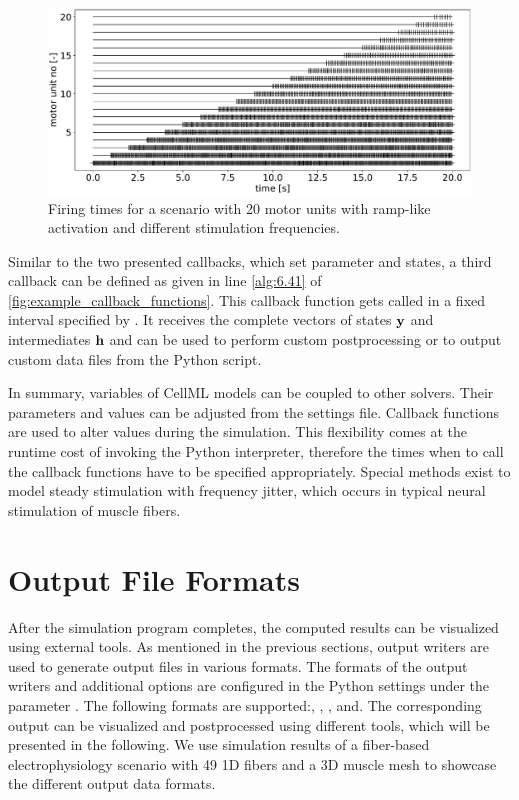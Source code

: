 \begin{figure}%
  \centering%
  \includegraphics[width=\textwidth]{images/implementation/firing_times_ramp1.pdf}%
  \caption{Firing times for a scenario with 20 motor units with ramp-like activation and different stimulation frequencies.}%
  \label{fig:firing_times_ramp}%
\end{figure}%

Similar to the two presented callbacks, which set parameter and states, a third callback  can be defined as given in line \ref{alg:6.41} of \cref{fig:example_callback_functions}. This callback function gets called in a fixed interval specified by . It receives the complete vectors of states $\textbf{y}$ and intermediates $\textbf{h}$ and can be used to perform custom postprocessing or to output custom data files from the Python script.

In summary, variables of CellML models can be coupled to other solvers. Their parameters and values can be adjusted from the settings file. Callback functions are used to alter values during the simulation. This flexibility comes at the runtime cost of invoking the Python interpreter, therefore the times when to call the callback functions have to be specified appropriately. Special methods exist to model steady stimulation with frequency jitter, which occurs in typical neural stimulation of muscle fibers.

\section{Output File Formats}\label{sec:output_file_formats}

After the simulation program completes, the computed results can be visualized using external tools.
As mentioned in the previous sections, output writers are used to generate output files in various formats. The formats of the output writers and additional options are configured in the Python settings under the parameter . The following formats are supported:, , ,  and\break{}.
The corresponding output can be visualized and postprocessed using different tools, which will be presented in the following. We use simulation results of a fiber-based electrophysiology scenario with 49 1D fibers and a 3D muscle mesh to showcase the different output data formats.

